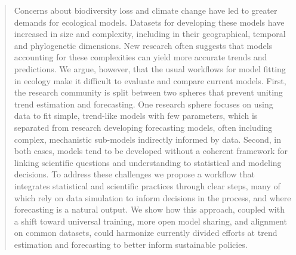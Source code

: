 \documentclass[11pt]{article}
\begin{document}
\begin{abstract}
Concerns about biodiversity loss and climate change have led to greater demands for ecological models. Datasets for developing these models have increased in size and complexity, including in their geographical, temporal and phylogenetic dimensions. New research often suggests that models accounting for these complexities can yield more accurate trends and predictions. 
We argue, however, that the usual workflows for model fitting in ecology make it difficult to evaluate and compare current models. First, the research community is split between two spheres that prevent uniting trend estimation and forecasting. One research sphere focuses on using data to fit simple, trend-like models with few parameters, which is separated from research developing forecasting models, often including complex, mechanistic sub-models indirectly informed by data. Second, in both cases, models tend to be developed without a coherent framework for linking scientific questions and understanding to statistical and modeling decisions. To address these challenges we propose a workflow that integrates statistical and scientific practices through clear steps, many of which rely on data simulation to inform decisions in the process, and where forecasting is a natural output. We show how this approach, coupled with a shift toward universal training, more open model sharing, and alignment on common datasets, could harmonize currently divided efforts at trend estimation and forecasting to better inform sustainable policies.


\end{abstract}
\end{document}
